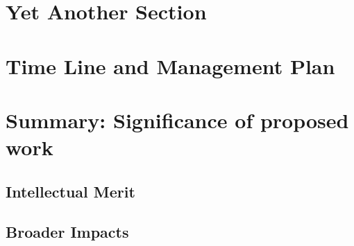 \documentclass{proposal}
\begin{document}
\section{Yet Another Section}

\section{Time Line and Management Plan}

\section{Summary:  Significance of proposed work}

\subsection{Intellectual Merit}

\subsection{Broader Impacts}


\newpage
{}
\renewcommand{\thepage} {E--\arabic{page}}




\newpage
{}
\renewcommand{\thepage} {G--\arabic{page}}
\end{document}
